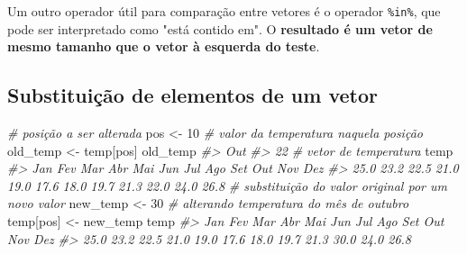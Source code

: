 \documentclass[]{book}
\newenvironment{Shaded}{\begin{snugshade}}{\end{snugshade}}
\newcommand{\KeywordTok}[1]{\textcolor[rgb]{0.13,0.29,0.53}{\textbf{#1}}}
\newcommand{\DecValTok}[1]{\textcolor[rgb]{0.00,0.00,0.81}{#1}}
\newcommand{\StringTok}[1]{\textcolor[rgb]{0.31,0.60,0.02}{#1}}
\newcommand{\CommentTok}[1]{\textcolor[rgb]{0.56,0.35,0.01}{\textit{#1}}}
\newcommand{\OperatorTok}[1]{\textcolor[rgb]{0.81,0.36,0.00}{\textbf{#1}}}
\newcommand{\NormalTok}[1]{#1}
\begin{document}
Um outro operador útil para comparação entre vetores é o operador
\texttt{\%in\%}, que pode ser interpretado como "está contido em". O
\textbf{resultado é um vetor de mesmo tamanho que o vetor à esquerda do
teste}.

\begin{Shaded}
\end{Shaded}

\subsection{Substituição de elementos de um
vetor}\label{substituicao-de-elementos-de-um-vetor}

\begin{Shaded}
\begin{Highlighting}[]
\CommentTok{# posição a ser alterada}
\NormalTok{pos <-}\StringTok{ }\DecValTok{10}
\CommentTok{# valor da temperatura naquela posição}
\NormalTok{old_temp <-}\StringTok{ }\NormalTok{temp[pos]}
\NormalTok{old_temp}
\CommentTok{#> Out }
\CommentTok{#>  22}
\CommentTok{# vetor de temperatura}
\NormalTok{temp}
\CommentTok{#>  Jan  Fev  Mar  Abr  Mai  Jun  Jul  Ago  Set  Out  Nov  Dez }
\CommentTok{#> 25.0 23.2 22.5 21.0 19.0 17.6 18.0 19.7 21.3 22.0 24.0 26.8}
\CommentTok{# substituição do valor original por um novo valor}
\NormalTok{new_temp <-}\StringTok{ }\DecValTok{30}
\CommentTok{# alterando temperatura do mês de outubro}
\NormalTok{temp[pos] <-}\StringTok{ }\NormalTok{new_temp}
\NormalTok{temp}
\CommentTok{#>  Jan  Fev  Mar  Abr  Mai  Jun  Jul  Ago  Set  Out  Nov  Dez }
\CommentTok{#> 25.0 23.2 22.5 21.0 19.0 17.6 18.0 19.7 21.3 30.0 24.0 26.8}
\end{Highlighting}
\end{Shaded}
\end{document}
